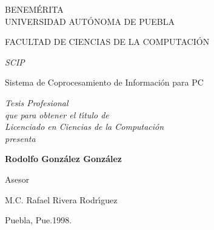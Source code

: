 \begin{titlepage}


\vspace*{40mm}

\begin{center}

{\Large{\cal BENEM\'ERITA\\UNIVERSIDAD AUT\'ONOMA DE PUEBLA}}

\vspace*{5mm}

{\Large{\cal FACULTAD DE CIENCIAS DE LA COMPUTACI\'ON}}

\vspace*{8mm}

{\LARGE{\it SCIP}}

\vspace*{4mm}

{\LARGE Sistema de Coprocesamiento de Informaci\'on para PC}

\vspace*{10mm}

{\large{\it Tesis Profesional\\
que para obtener el t\'{\i}tulo de\\
Licenciado en Ciencias de la Computaci\'on\\
presenta}}
             
\vspace*{5mm}             
               
{\Large {\bf Rodolfo Gonz\'alez Gonz\'alez}}

\vspace*{8mm}

{\large Asesor

M.C. Rafael Rivera Rodr\'{\i}guez}

\vspace*{8mm}

{\large Puebla, Pue.\hspace*{8cm}1998.}

\end{center}
\end{titlepage}
